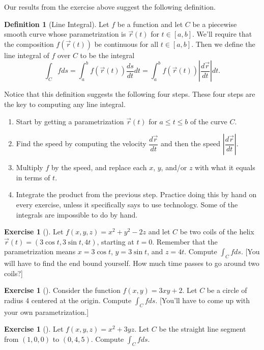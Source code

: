 \documentclass[10pt,]{book}
\theoremstyle{plain}
\theoremstyle{definition}
\newtheorem{definition}[theorem]{Definition}
\theoremstyle{definition}
\theoremstyle{definition}
\theoremstyle{definition}
\newtheorem{exploration}[project]{Exercise}
\theoremstyle{definition}
\numberwithin{equation}{section}
\begin{document}
Our results from the exercise above suggest the following definition.%
\begin{definition}[{Line Integral}]\label{definition-34}
Let \(f\) be a function and let \(C\) be a piecewise smooth curve whose parametrization is \(\vec r(t)\) for \(t\in[a,b]\). We'll require that the composition \(f(\vec r(t))\) be continuous for all \(t\in [a,b]\). Then we define the line integral of \(f\) over \(C\) to be the integral%
\begin{equation*}
\int_C f ds 
= \int_a^b f(\vec r(t))\frac{ds}{dt}dt
= \int_a^b f(\vec r(t))\left|\frac{d\vec r}{dt}\right|dt.
\end{equation*}
%
\end{definition}
Notice that this definition suggests the following four steps. These four steps are the key to computing any line integral.  \leavevmode%
\begin{enumerate}
\item\hypertarget{li-141}{}Start by getting a parametrization \(\vec r(t)\) for \(a\leq t\leq b\) of the curve \(C\).%
\item\hypertarget{li-142}{}Find the speed by computing the velocity \(\dfrac{d\vec r}{dt}\) and then the speed \(\left|\dfrac{d\vec r}{dt}\right|\).%
\item\hypertarget{li-143}{}Multiply \(f\) by the speed, and replace each \(x\), \(y\), and/or \(z\) with what it equals in terms of \(t\).%
\item\hypertarget{li-144}{}Integrate the product from the previous step. Practice doing this by hand on every exercise, unless it specifically says to use technology. Some of the integrals are impossible to do by hand.%
\end{enumerate}
%
\begin{exploration}[]\label{exploration-198}
Let \(f(x,y,z)=x^2+y^2-2z\) and let \(C\) be two coils of the helix \(\vec r(t)=(3\cos t, 3\sin t, 4t)\), starting at \(t=0\). Remember that the parametrization means \(x=3\cos t\), \(y=3\sin t\), and \(z=4t\). Compute \(\int_Cf ds\). [You will have to find the end bound yourself. How much time passes to go around two coils?]%
\end{exploration}
\begin{exploration}[]\label{exploration-199}
Consider the function \(f(x,y)=3xy+2\). Let \(C\) be a circle of radius 4 centered at the origin. Compute \(\int_C fds\). [You'll have to come up with your own parametrization.]%
\end{exploration}
\begin{exploration}[]\label{exploration-200}
Let \(f(x,y,z)=x^2+3yz\). Let \(C\) be the straight line segment from \((1,0,0)\) to \((0,4,5)\). Compute \(\int_C f ds\).%
\end{exploration}
\end{document}
